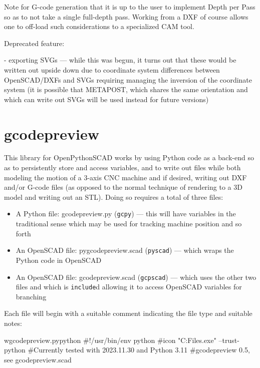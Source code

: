 \documentclass{ltxdoc}
\begin{document}
\begin{readme}
Note for G-code generation that it is up to the user 
to implement Depth per Pass so as to not take a 
single full-depth pass. Working from a DXF of course 
allows one to off-load such considerations to a 
specialized CAM tool.

Deprecated feature:

 - exporting SVGs --- while this was begun, it turns out that these would be written out upside down due to coordinate system differences between OpenSCAD/DXFs and SVGs requiring managing the inversion of the coordinate system (it is possible that METAPOST, which shares the same orientation and which can write out SVGs will be used instead for future versions)

\end{readme}

\clearpage
\section{gcodepreview}

This library for OpenPythonSCAD works by using Python code as a back-end so as to persistently store 
and access variables, and to write out files while both modeling the motion of a 3-axis CNC machine
and if desired, writing out DXF and/or G-code files (as opposed to the normal technique of 
rendering to a 3D model and writing out an STL). Doing so requires a total of three files:

\begin{itemize}
\item A Python file: gcodepreview.py (\texttt{gcpy}) --- this will have variables in the 
      traditional sense which may be used for tracking machine position and so forth
\item An OpenSCAD file: pygcodepreview.scad (\texttt{pyscad}) --- which wraps the Python code 
      in OpenSCAD
\item An OpenSCAD file: gcodepreview.scad (\texttt{gcpscad}) --- which uses the other two files 
      and which is \texttt{include}d allowing it to access OpenSCAD variables for branching   
\end{itemize}
 
Each file will begin with a suitable comment indicating the file type and suitable notes:

\begin{writecode}{w}{gcodepreview.py}{python}
#!/usr/bin/env python
#icon "C:\Program Files\OpenSCAD\bin\openscad.exe" --trust-python
#Currently tested with 2023.11.30 and Python 3.11
#gcodepreview 0.5, see gcodepreview.scad

\end{writecode}
\addtocounter{gcpy}{6}
\end{document}
